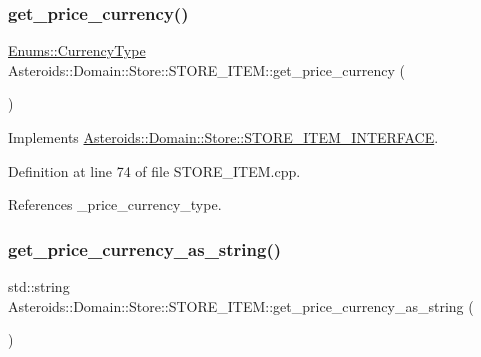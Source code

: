 \subsubsection{\texorpdfstring{get\+\_\+price\+\_\+currency()}{get\_price\_currency()}}
{\footnotesize\ttfamily \hyperlink{namespaceAsteroids_1_1Domain_1_1Store_1_1Enums_a995d66dbd6bc566c0765fdcfd7be6006}{Enums\+::\+Currency\+Type} Asteroids\+::\+Domain\+::\+Store\+::\+S\+T\+O\+R\+E\+\_\+\+I\+T\+E\+M\+::get\+\_\+price\+\_\+currency (\begin{DoxyParamCaption}{ }\end{DoxyParamCaption})\hspace{0.3cm}{\ttfamily [virtual]}}



Implements \hyperlink{classAsteroids_1_1Domain_1_1Store_1_1STORE__ITEM__INTERFACE_abe2b040ee1d6676d604123e1ea102e09}{Asteroids\+::\+Domain\+::\+Store\+::\+S\+T\+O\+R\+E\+\_\+\+I\+T\+E\+M\+\_\+\+I\+N\+T\+E\+R\+F\+A\+CE}.



Definition at line 74 of file S\+T\+O\+R\+E\+\_\+\+I\+T\+E\+M.\+cpp.



References \+\_\+price\+\_\+currency\+\_\+type.

\mbox{\label{classAsteroids_1_1Domain_1_1Store_1_1STORE__ITEM_a55c625077b78bf51b53880a2a77a8ece}} 
\subsubsection{\texorpdfstring{get\+\_\+price\+\_\+currency\+\_\+as\+\_\+string()}{get\_price\_currency\_as\_string()}}
{\footnotesize\ttfamily std\+::string Asteroids\+::\+Domain\+::\+Store\+::\+S\+T\+O\+R\+E\+\_\+\+I\+T\+E\+M\+::get\+\_\+price\+\_\+currency\+\_\+as\+\_\+string (\begin{DoxyParamCaption}{ }\end{DoxyParamCaption})\hspace{0.3cm}{\ttfamily [virtual]}}



